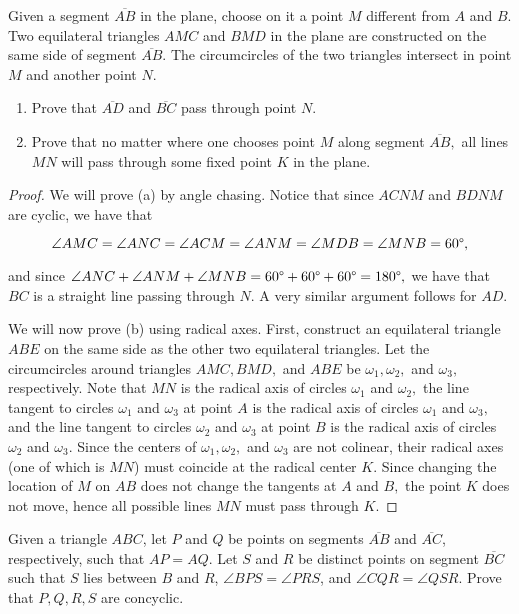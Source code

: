 \documentclass[letterpaper,oneside]{scrartcl}
\providecommand{\ii}{\item}
\begin{document}
\begin{problem*}
  [2.27, BAMO 2012/4]   Given a segment $\overline{AB}$ in the plane, choose on it a point $M$ different from $A$ and $B$. Two equilateral triangles $AMC$ and $BMD$ in the plane are constructed on the same side of segment $\overline{AB}.$ The circumcircles of the two triangles intersect in point $M$ and another point $N.$
\renewcommand{\labelenumi}{(\alph{enumi})}
\begin{enumerate}
  \ii Prove that $\overline{AD}$ and $\overline{BC}$ pass through point $N.$

  \ii Prove that no matter where one chooses point $M$ along segment $\overline{AB},$ all lines $MN$ will pass through some fixed point $K$ in the plane.
\end{enumerate}
\end{problem*}
\begin{proof}  We will prove (a) by angle chasing. Notice that since $ACNM$ and $BDNM$ are cyclic, we have that

$$\angle AMC = \angle ANC = \angle ACM = \angle ANM = \angle MDB = \angle MNB = 60\degree,$$

and since $\angle ANC + \angle ANM + \angle MNB = 60\degree + 60\degree + 60\degree = 180\degree,$ we have that $BC$ is a straight line passing through $N.$ A very similar argument follows for $AD.$

We will now prove (b) using radical axes. First, construct an equilateral triangle $ABE$ on the same side as the other two equilateral triangles. Let the circumcircles around triangles $AMC, BMD,$ and $ABE$ be $\omega_1, \omega_2,$ and $\omega_3,$ respectively. Note that $MN$ is the radical axis of circles $\omega_1$ and $\omega_2,$ the line tangent to circles $\omega_1$ and $\omega_3$ at point $A$ is the radical axis of circles $\omega_1$ and $\omega_3,$ and the line tangent to circles $\omega_2$ and $\omega_3$ at point $B$ is the radical axis of circles $\omega_2$ and $\omega_3.$ Since the centers of  $\omega_1, \omega_2,$ and $\omega_3$ are not colinear, their radical axes (one of which is $MN$) must coincide at the radical center $K.$ Since changing the location of $M$ on $AB$ does not change the tangents at $A$ and $B,$ the point $K$ does not move, hence all possible lines $MN$ must pass through $K.$ \end{proof}

  

  \begin{problem*}
    [2.28, JMO 2012/1]
    Given a triangle $ABC$, let $P$ and $Q$ be points on segments $\overline{AB}$ and $\overline{AC}$, respectively, such that $AP = AQ.$ Let $S$ and $R$ be distinct points on segment $\overline{BC}$ such that $S$ lies between $B$ and $R$, $\angle BPS = \angle PRS$, and $\angle CQR = \angle QSR$. Prove that $P, Q, R, S$ are concyclic.
  \end{problem*}
\end{document}
